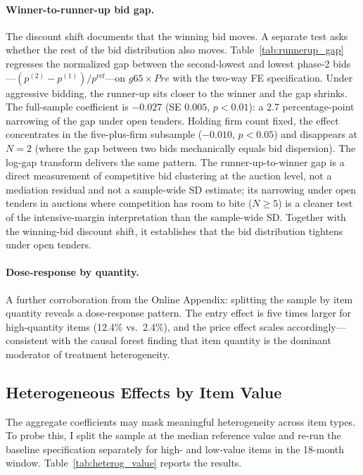\paragraph{Winner-to-runner-up bid gap.}
The discount shift documents that the winning bid moves. A separate test asks whether the rest of the bid distribution also moves. Table~\ref{tab:runnerup_gap} regresses the normalized gap between the second-lowest and lowest phase-2 bids---$(p^{(2)}-p^{(1)})/p^{\text{ref}}$---on $\mathit{g65}\times\mathit{Pre}$ with the two-way FE specification. Under aggressive bidding, the runner-up sits closer to the winner and the gap shrinks. The full-sample coefficient is $-0.027$ (SE $0.005$, $p<0.01$): a 2.7 percentage-point narrowing of the gap under open tenders. Holding firm count fixed, the effect concentrates in the five-plus-firm subsample ($-0.010$, $p<0.05$) and disappears at $N=2$ (where the gap between two bids mechanically equals bid dispersion). The log-gap transform delivers the same pattern. The runner-up-to-winner gap is a direct measurement of competitive bid clustering at the auction level, not a mediation residual and not a sample-wide SD estimate; its narrowing under open tenders in auctions where competition has room to bite ($N\geq 5$) is a cleaner test of the intensive-margin interpretation than the sample-wide SD. Together with the winning-bid discount shift, it establishes that the bid distribution tightens under open tenders.



\paragraph{Dose-response by quantity.}
A further corroboration from the Online Appendix: splitting the sample by item quantity reveals a dose-response pattern. The entry effect is five times larger for high-quantity items (12.4\% vs.\ 2.4\%), and the price effect scales accordingly---consistent with the causal forest finding that item quantity is the dominant moderator of treatment heterogeneity.

\subsection{Heterogeneous Effects by Item Value}

The aggregate coefficients may mask meaningful heterogeneity across item types. To probe this, I split the sample at the median reference value and re-run the baseline specification separately for high- and low-value items in the 18-month window. Table~\ref{tab:heterog_value} reports the results.

